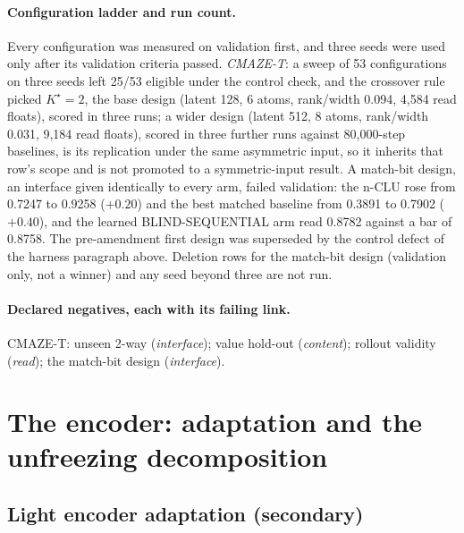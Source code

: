\documentclass{article} %
\newcommand{\Kstar}{\ensuremath{K^{\star}}}
\begin{document}
\paragraph{Configuration ladder and run count.} Every configuration was measured on validation first,
and three seeds were used only after its validation criteria passed. \emph{CMAZE-T}: a sweep of
53 configurations on three seeds left 25/53 eligible under the control check, and the crossover rule picked
$\Kstar=2$, the base design (latent 128, 6 atoms, rank/width 0.094, 4,584 read floats), scored in three
runs; a wider design (latent 512, 8 atoms, rank/width 0.031, 9,184 read floats), scored in three further %
runs against 80,000-step baselines, is its replication under the same asymmetric input, so it inherits that row's scope and is not
promoted to a symmetric-input result. A match-bit design, an interface given identically to
every arm, failed validation: the n-CLU rose from 0.7247 to 0.9258 ($+0.20$) and the best matched
baseline from 0.3891 to 0.7902 ($+0.40$), and the learned BLIND-SEQUENTIAL arm read 0.8782 against a bar
of 0.8758. The pre-amendment first design was superseded by the control defect of the harness paragraph
above. Deletion rows for the match-bit design (validation only, not a winner) and any seed beyond three are
not run.
\paragraph{Declared negatives, each with its failing link.} CMAZE-T: unseen 2-way
(\emph{interface}); value hold-out (\emph{content}); rollout validity (\emph{read}); the match-bit
design (\emph{interface}).

\section{The encoder: adaptation and the unfreezing decomposition}
\label{app:encoder-main}

\subsection*{Light encoder adaptation (secondary)}
\end{document}
